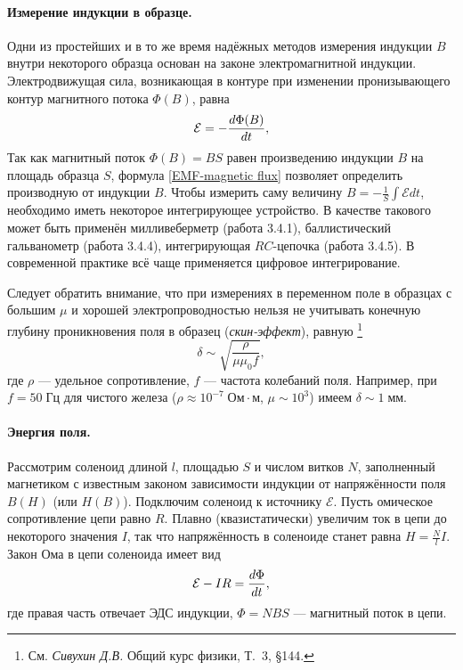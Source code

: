 \paragraph{Измерение индукции в образце.}
Одни из простейших и в то же время надёжных методов измерения
индукции $B$ внутри некоторого образца основан
на законе электромагнитной индукции.
Электродвижущая сила, возникающая в контуре при изменении
пронизывающего контур магнитного потока $\Phi(B)$, равна
\begin{equation}
	\eqmark{EMF-magnetic flux}
	\mathcal{E} = - \frac{d\Phi (B)}{dt},
\end{equation}
Так как магнитный поток $\Phi (B)=BS$ равен произведению индукции $B$ на площадь
образца $S$, формула \eqref{EMF-magnetic flux} позволяет определить производную от
индукции $B$. Чтобы измерить саму величину $B=-\frac1{S}\int \mathcal{E} dt$,
необходимо иметь некоторое интегрирующее устройство.
В качестве такового может быть применён милливеберметр (работа 3.4.1),
баллистический гальванометр (работа 3.4.4), интегрирующая $RC$-цепочка
(работа 3.4.5). В современной практике всё чаще применяется цифровое интегрирование.

Следует обратить внимание, что при измерениях в переменном поле
в образцах с большим $\mu$ и хорошей электропроводностью
нельзя не учитывать конечную глубину
проникновения поля в образец (\emph{скин-эффект}), равную%
\footnote{См. \textit{Сивухин Д.В.} Общий курс физики, Т.~3, \S 144.}
\[
\delta \sim \sqrt{\frac{\rho}{\mu \mu_0 f}},
\]
где $\rho$ --- удельное сопротивление, $f$ --- частота колебаний поля.
Например, при $f=50\;Гц$ для чистого железа ($\rho \approx 10^{-7}\;Ом\cdot м$,
$\mu \sim 10^3$) имеем $\delta \sim 1\;мм$.



\paragraph{Энергия поля.}
Рассмотрим соленоид длиной $l$, площадью $S$ и числом витков $N$,
заполненный магнетиком с известным законом зависимости индукции от напряжённости
поля $B(H)$ (или $H(B)$). Подключим соленоид к источнику $\mathcal{E}$.
Пусть омическое сопротивление цепи равно $R$.
Плавно (квазистатически) увеличим ток в цепи до некоторого значения
$I$, так что напряжённость в соленоиде станет равна
$H = \frac{N}{l} I$. Закон Ома в цепи соленоида имеет вид
\begin{equation}
    \eqmark{OhmLaw-solenoid}
\mathcal{E} - IR = \frac{d\Phi}{dt},
\end{equation}
где правая часть отвечает ЭДС индукции, $\Phi = NBS$ --- магнитный поток в
цепи.

